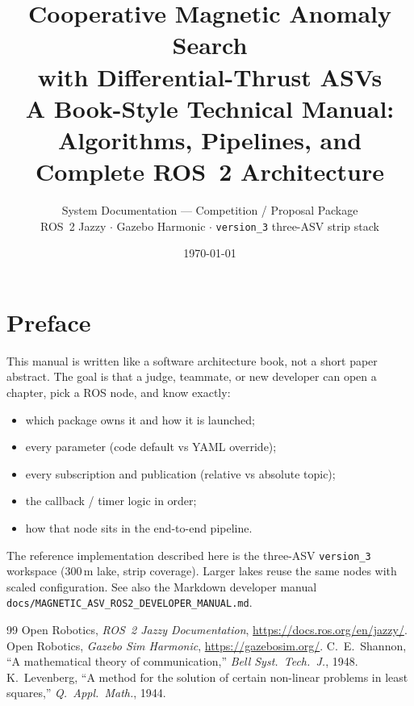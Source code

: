 \documentclass[11pt,a4paper,oneside,openany]{book}
\title{\textbf{Cooperative Magnetic Anomaly Search\\
with Differential-Thrust ASVs}\\[0.6em]
\large A Book-Style Technical Manual:\\
Algorithms, Pipelines, and Complete ROS~2 Architecture}
\author{
  System Documentation --- Competition / Proposal Package\\
  ROS~2 Jazzy $\cdot$ Gazebo Harmonic $\cdot$ \texttt{version\_3} three-ASV strip stack
}
\date{\today}
\begin{document}
\frontmatter
\maketitle

\chapter*{Preface}
This manual is written like a software architecture book, not a short paper
abstract. The goal is that a judge, teammate, or new developer can open a
chapter, pick a ROS node, and know exactly:

\begin{itemize}[leftmargin=*]
  \item which package owns it and how it is launched;
  \item every parameter (code default vs YAML override);
  \item every subscription and publication (relative vs absolute topic);
  \item the callback / timer logic in order;
  \item how that node sits in the end-to-end pipeline.
\end{itemize}

The reference implementation described here is the three-ASV
\texttt{version\_3} workspace (\(300\,\mathrm{m}\) lake, strip coverage). Larger
lakes reuse the same nodes with scaled configuration. See also the Markdown
developer manual \texttt{docs/MAGNETIC\_ASV\_ROS2\_DEVELOPER\_MANUAL.md}.

\tableofcontents

\mainmatter









\backmatter
\begin{thebibliography}{99}
 Open Robotics, \emph{ROS~2 Jazzy Documentation},
  \url{https://docs.ros.org/en/jazzy/}.
 Open Robotics, \emph{Gazebo Sim Harmonic},
  \url{https://gazebosim.org/}.
 C.~E.~Shannon, ``A mathematical theory of communication,''
  \emph{Bell Syst.\ Tech.\ J.}, 1948.
 K.~Levenberg, ``A method for the solution of certain non-linear
  problems in least squares,'' \emph{Q.\ Appl.\ Math.}, 1944.
\end{thebibliography}
\end{document}
